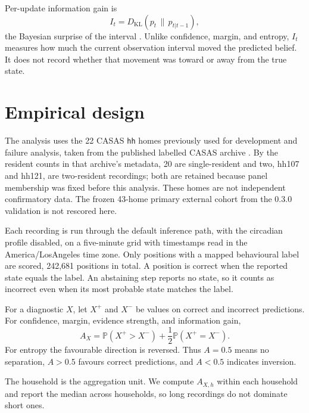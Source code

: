 \documentclass[11pt]{article}
\newcommand{\Prob}{\mathbb{P}}
\newcommand{\KL}{D_{\mathrm{KL}}}
\renewcommand{\_}{\textunderscore\allowbreak}
\begin{document}
Per-update information gain is
\[
I_t=\KL\!\left(p_t\,\|\,p_{t|t-1}\right),
\]
the Bayesian surprise of the interval \citep{itti2009surprise}. Unlike confidence, margin, and entropy, $I_t$ measures how much the current observation interval moved the predicted belief. It does not record whether that movement was toward or away from the true state.

\section{Empirical design}
The analysis uses the 22 CASAS \texttt{hh} homes previously used for development and failure analysis, taken from the published labelled CASAS archive \citep{cook2013casas,cook2025casasdata}. By the resident counts in that archive's metadata, 20 are single-resident and two, hh107 and hh121, are two-resident recordings; both are retained because panel membership was fixed before this analysis. These homes are not independent confirmatory data. The frozen 43-home primary external cohort from the 0.3.0 validation is not rescored here.

Each recording is run through the default inference path, with the circadian profile disabled, on a five-minute grid with timestamps read in the America/Los\_Angeles time zone. Only positions with a mapped behavioural label are scored, 242,681 positions in total. A position is correct when the reported state equals the label. An abstaining step reports no state, so it counts as incorrect even when its most probable state matches the label.

For a diagnostic $X$, let $X^+$ and $X^-$ be values on correct and incorrect predictions. For confidence, margin, evidence strength, and information gain,
\[
A_X=\Prob(X^+>X^-)+\frac12\Prob(X^+=X^-).
\]
For entropy the favourable direction is reversed. Thus $A=0.5$ means no separation, $A>0.5$ favours correct predictions, and $A<0.5$ indicates inversion.

The household is the aggregation unit. We compute $A_{X,h}$ within each household and report the median across households, so long recordings do not dominate short ones.
\end{document}
